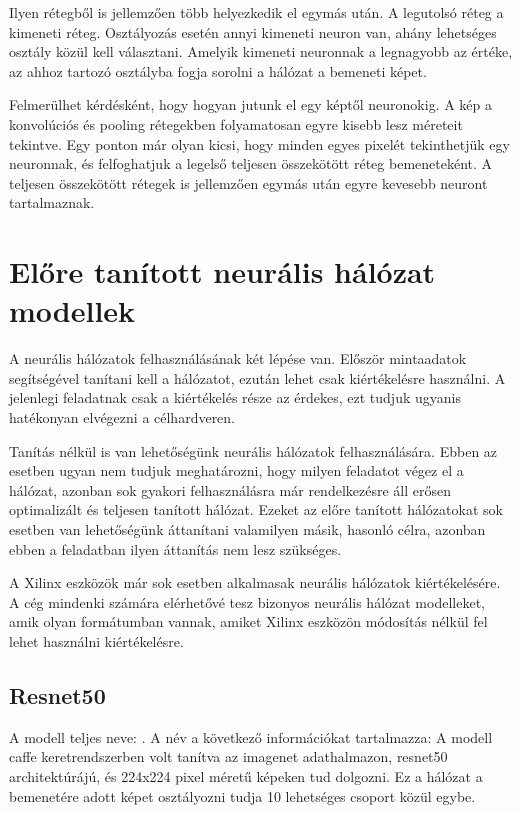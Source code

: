 Ilyen rétegből is jellemzően több helyezkedik el egymás után. A legutolsó réteg a kimeneti réteg. Osztályozás esetén annyi kimeneti neuron van, ahány lehetséges osztály közül kell választani. Amelyik kimeneti neuronnak a legnagyobb az értéke, az ahhoz tartozó osztályba fogja sorolni a hálózat a bemeneti képet.

Felmerülhet kérdésként, hogy hogyan jutunk el egy képtől neuronokig. A kép a konvolúciós és pooling rétegekben folyamatosan egyre kisebb lesz méreteit tekintve. Egy ponton már olyan kicsi, hogy minden egyes pixelét tekinthetjük egy neuronnak, és felfoghatjuk a legelső teljesen összekötött réteg bemeneteként. A teljesen összekötött rétegek is jellemzően egymás után egyre kevesebb neuront tartalmaznak.

\section{Előre tanított neurális hálózat modellek}

A neurális hálózatok felhasználásának két lépése van. Először mintaadatok segítségével tanítani kell a hálózatot, ezután lehet csak kiértékelésre használni. A jelenlegi feladatnak csak a kiértékelés része az érdekes, ezt tudjuk ugyanis hatékonyan elvégezni a célhardveren.

Tanítás nélkül is van lehetőségünk neurális hálózatok felhasználására. Ebben az esetben ugyan nem tudjuk meghatározni, hogy milyen feladatot végez el a hálózat, azonban sok gyakori felhasználásra már rendelkezésre áll erősen optimalizált és teljesen tanított hálózat. Ezeket az előre tanított hálózatokat sok esetben van lehetőségünk áttanítani valamilyen másik, hasonló célra, azonban ebben a feladatban ilyen áttanítás nem lesz szükséges.

A Xilinx eszközök már sok esetben alkalmasak neurális hálózatok kiértékelésére. A cég mindenki számára elérhetővé tesz bizonyos neurális hálózat modelleket, amik olyan formátumban vannak, amiket Xilinx eszközön módosítás nélkül fel lehet használni kiértékelésre.
\cite{ModelZoo}

\subsection{Resnet50}
A modell teljes neve: . A név a következő információkat tartalmazza: A modell caffe keretrendszerben volt tanítva az imagenet adathalmazon, resnet50 architektúrájú, és 224x224 pixel méretű képeken tud dolgozni. Ez a hálózat a bemenetére adott képet osztályozni tudja 10 lehetséges csoport közül egybe.

